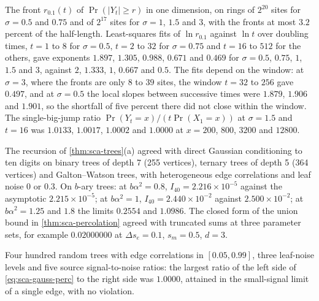 \begin{numcheck}[Fronts]\label{chk:sca-fronts}
The front $r_{0.1}(t)$ of $\Pr(|Y_t|\ge r)$ in one dimension, on rings of $2^{20}$ sites for $\sigma=0.5$ and $0.75$ and of $2^{17}$ sites for $\sigma=1$, $1.5$ and $3$, with the fronts at most $3.2$ percent of the half-length. Least-squares fits of $\ln r_{0.1}$ against $\ln t$ over doubling times, $t=1$ to $8$ for $\sigma=0.5$, $t=2$ to $32$ for $\sigma=0.75$ and $t=16$ to $512$ for the others, gave exponents $1.897$, $1.305$, $0.988$, $0.671$ and $0.469$ for $\sigma=0.5$, $0.75$, $1$, $1.5$ and $3$, against $2$, $1.333$, $1$, $0.667$ and $0.5$. The fits depend on the window: at $\sigma=3$, where the fronts are only $8$ to $39$ sites, the window $t=32$ to $256$ gave $0.497$, and at $\sigma=0.5$ the local slopes between successive times were $1.879$, $1.906$ and $1.901$, so the shortfall of five percent there did not close within the window. The single-big-jump ratio $\Pr(Y_t=x)/(t\Pr(X_1=x))$ at $\sigma=1.5$ and $t=16$ was $1.0133$, $1.0017$, $1.0002$ and $1.0000$ at $x=200$, $800$, $3200$ and $12800$.
\end{numcheck}

\begin{numcheck}\label{chk:sca-trees}
The recursion of \cref{thm:sca-trees}(a) agreed with direct Gaussian conditioning to ten digits on binary trees of depth 7 (255 vertices), ternary trees of depth 5 (364 vertices) and Galton--Watson trees, with heterogeneous edge correlations and leaf noise $0$ or $0.3$. On $b$-ary trees: at $b\alpha^2=0.8$, $I_{40}=2.216\times10^{-5}$ against the asymptotic $2.215\times10^{-5}$; at $b\alpha^2=1$, $I_{40}=2.440\times10^{-2}$ against $2.500\times10^{-2}$; at $b\alpha^2=1.25$ and $1.8$ the limits $0.2554$ and $1.0986$. The closed form of the union bound in \cref{thm:sca-percolation} agreed with truncated sums at three parameter sets, for example $0.02000000$ at $\Delta s_e=0.1$, $s_m=0.5$, $d=3$.
\end{numcheck}

\begin{numcheck}\label{chk:sca-gaussian-percolation}
Four hundred random trees with edge correlations in $[0.05,0.99]$, three leaf-noise levels and five source signal-to-noise ratios: the largest ratio of the left side of \eqref{eq:sca-gauss-perc} to the right side was $1.0000$, attained in the small-signal limit of a single edge, with no violation.
\end{numcheck}

